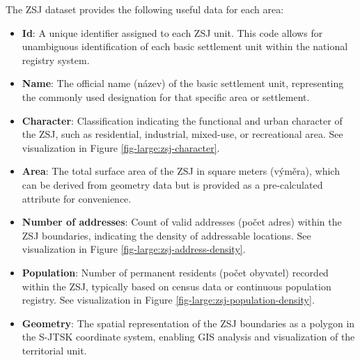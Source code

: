 The ZSJ dataset provides the following useful data for each area:

\begin{itemize}
    \item \textbf{Id}: A unique identifier assigned to each ZSJ unit. This code allows for unambiguous identification of each basic settlement unit within the national registry system.
    \item \textbf{Name}: The official name (název) of the basic settlement unit, representing the commonly used designation for that specific area or settlement.
    \item \textbf{Character}: Classification indicating the functional and urban character of the ZSJ, such as residential, industrial, mixed-use, or recreational area. See visualization in Figure \ref{fig-large:zsj-character}.
    \item \textbf{Area}: The total surface area of the ZSJ in square meters (výměra), which can be derived from geometry data but is provided as a pre-calculated attribute for convenience.
    \item \textbf{Number of addresses}: Count of valid addresses (počet adres) within the ZSJ boundaries, indicating the density of addressable locations. See visualization in Figure \ref{fig-large:zsj-address-density}.
    \item \textbf{Population}: Number of permanent residents (počet obyvatel) recorded within the ZSJ, typically based on census data or continuous population registry. See visualization in Figure \ref{fig-large:zsj-population-density}.
    \item \textbf{Geometry}: The spatial representation of the ZSJ boundaries as a polygon in the S-JTSK coordinate system, enabling GIS analysis and visualization of the territorial unit.
\end{itemize}

